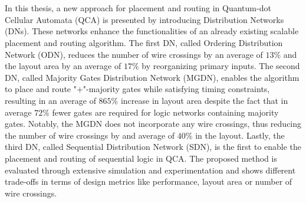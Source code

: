 \chapter{\abstractname}

In this thesis, a new approach for placement and routing in Quantum-dot Cellular Automata (QCA) is presented by introducing Distribution Networks (DNs). These networks enhance the functionalities of an already existing scalable placement and routing algorithm. The first DN, called Ordering Distribution Network (ODN), reduces the number of wire crossings by an average of $13\%$ and the layout area by an average of $17\%$ by reorganizing primary inputs. The second DN, called Majority Gates Distribution Network (MGDN), enables the algorithm to place and route "+"-majority gates while satisfying timing constraints, resulting in an average of $865\%$ increase in layout area despite the fact that in average $72\%$ fewer gates are required for logic networks containing majority gates. Notably, the MGDN does not incorporate any wire crossings, thus reducing the number of wire crossings by and average of $40\%$ in the layout. Lastly, the third DN, called Sequential Distribution Network (SDN), is the first to enable the placement and routing of sequential logic in QCA. The proposed method is evaluated through extensive simulation and experimentation and shows different trade-offs in terms of design metrics like performance, layout area or number of wire crossings.





